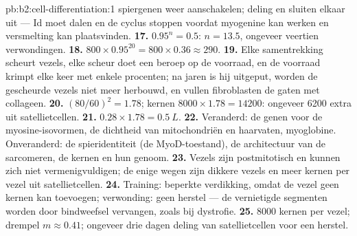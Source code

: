 \begin{solution}{pb:b2:cell-differentiation:1}
spiergenen weer aanschakelen; deling en  sluiten elkaar uit
--- Id moet dalen en de cyclus stoppen voordat myogenine kan werken en
versmelting kan plaatsvinden.
\textbf{17.} $0.95^{n} = 0.5$: $n = 13.5$, ongeveer veertien verwondingen.
\textbf{18.} $800\times 0.95^{20} = 800\times 0.36 \approx 290$.
\textbf{19.} Elke samentrekking scheurt vezels, elke scheur doet een beroep
op de voorraad, en de voorraad krimpt elke keer met enkele procenten; na
jaren is hij uitgeput, worden de gescheurde vezels niet meer herbouwd, en
vullen fibroblasten de gaten met collageen.
\textbf{20.} $(80/60)^{2} = 1.78$; kernen $8000\times 1.78 = \num{14200}$:
ongeveer \num{6200} extra uit satellietcellen.
\textbf{21.} $0.28\times 1.78 = \qty{0.5}{L}$.
\textbf{22.} Veranderd: de genen voor de myosine-isovormen, de dichtheid van
mitochondriën en haarvaten, myoglobine. Onveranderd: de spieridentiteit
(de MyoD-toestand), de architectuur van de sarcomeren, de kernen en hun
genoom.
\textbf{23.} Vezels zijn postmitotisch en kunnen zich niet vermenigvuldigen;
de enige wegen zijn dikkere vezels en meer kernen per vezel uit
satellietcellen.
\textbf{24.} Training: beperkte verdikking, omdat de vezel geen kernen kan
toevoegen; verwonding: geen herstel --- de vernietigde segmenten worden door
bindweefsel vervangen, zoals bij dystrofie.
\textbf{25.} \num{8000} kernen per vezel; drempel $m \approx 0.41$;
ongeveer drie dagen deling van satellietcellen voor een herstel.
\end{solution}
